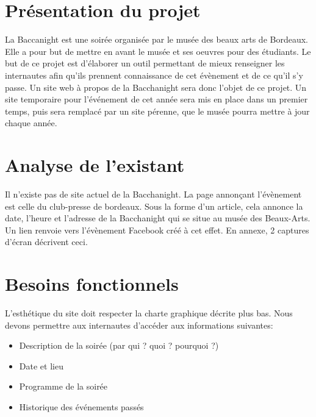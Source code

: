 \documentclass[12pt]{article}
\begin{document}
\section{Présentation du projet}

La Baccanight est une soirée organisée par le musée des beaux arts de Bordeaux. Elle a pour but de mettre en avant le musée et ses oeuvres pour des étudiants. Le but de ce projet est d’élaborer un outil permettant de mieux renseigner les internautes afin qu’ils prennent connaissance de cet évènement et de ce qu’il s’y passe. Un site web à propos de la Bacchanight sera donc l’objet de ce projet. Un site temporaire pour l'événement de cet année sera mis en place dans un premier temps, puis sera remplacé par un site pérenne, que le musée pourra mettre à jour chaque année.


\section{Analyse de l'existant}

Il n’existe pas de site actuel de la Bacchanight. La page annonçant l’évène\-ment est celle du club-presse de bordeaux. Sous la forme d’un article, cela annonce la date, l’heure et l’adresse de la Bacchanight qui se situe au musée des Beaux-Arts. Un lien renvoie vers l’évènement Facebook créé à cet effet. En annexe, 2 captures d’écran décrivent ceci.


\section{Besoins fonctionnels}

L’esthétique du site doit respecter la charte graphique décrite plus bas. Nous devons permettre aux internautes d’accéder aux informations suivantes:
\begin{itemize}
  \item Description de la soirée (par qui ? quoi ? pourquoi ?)
  \item Date et lieu
  \item Programme de la soirée
  \item Historique des événements passés
\end{itemize}
\end{document}
